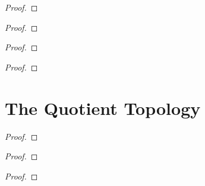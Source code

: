 \begin{proof}
\end{proof}


\begin{exercise}\label{chapter2:section21:exercise10}
\end{exercise}

\begin{proof}
\end{proof}


\begin{exercise}\label{chapter2:section21:exercise11}
\end{exercise}

\begin{proof}
\end{proof}


\begin{exercise}\label{chapter2:section21:exercise12}
\end{exercise}

\begin{proof}
\end{proof}


\section{The Quotient Topology}

\begin{exercise}\label{chapter2:section22:exercise1}
\end{exercise}

\begin{proof}
\end{proof}


\begin{exercise}\label{chapter2:section22:exercise2}
\end{exercise}

\begin{proof}
\end{proof}


\begin{exercise}\label{chapter2:section22:exercise3}
\end{exercise}

\begin{proof}
\end{proof}


\begin{exercise}\label{chapter2:section22:exercise4}
\end{exercise}

